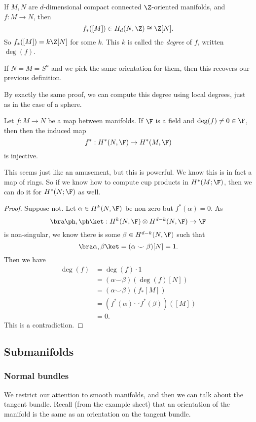\documentclass[a4paper]{article}
\theoremstyle{definition}
\begin{document}
\begin{defi}
  If $M, N$ are $d$-dimensional compact connected $\Z$-oriented manifolds, and $f: M \to N$, then
  \[
    f_*([M]) \in H_d(N, \Z) \cong \Z[N].
  \]
  So $f_*([M]) = k \Z[N]$ for some $k$. This $k$ is called the \emph{degree} of $f$, written $\deg (f)$.
\end{defi}

If $N = M = S^n$ and we pick the same orientation for them, then this recovers our previous definition.

By exactly the same proof, we can compute this degree using local degrees, just as in the case of a sphere.

\begin{cor}
  Let $f: M \to N$ be a map between manifolds. If $\F$ is a field and $\deg(f) \not= 0 \in \F$, then then the induced map
  \[
    f^*: H^*(N, \F) \to H^*(M, \F)
  \]
  is injective.
\end{cor}
This seems just like an amusement, but this is powerful. We know this is in fact a map of rings. So if we know how to compute cup products in $H^*(M; \F)$, then we can do it for $H^*(N; \F)$ as well.

\begin{proof}
  Suppose not. Let $\alpha \in H^k(N, \F)$ be non-zero but $f^*(\alpha) = 0$. As
  \[
    \bra \ph, \ph \ket: H^k(N, \F) \otimes H^{d - k}(N, \F) \to \F
  \]
  is non-singular, we know there is some $\beta \in H^{d - k}(N, \F)$ such that
  \[
    \bra \alpha, \beta\ket = (\alpha \smile \beta)[N] = 1.
  \]
  Then we have
  \begin{align*}
    \deg(f) &= \deg (f) \cdot 1 \\
    &= (\alpha \smile \beta)(\deg(f) [N]) \\
    &= (\alpha \smile \beta) (f_*[M]) \\
    &= (f^*(\alpha) \smile f^*(\beta))([M])\\
    &= 0.
  \end{align*}
  This is a contradiction.
\end{proof}

\subsection{Submanifolds}
\subsubsection*{Normal bundles}
We restrict our attention to smooth manifolds, and then we can talk about the tangent bundle. Recall (from the example sheet) that an orientation of the manifold is the same as an orientation on the tangent bundle.
\end{document}
